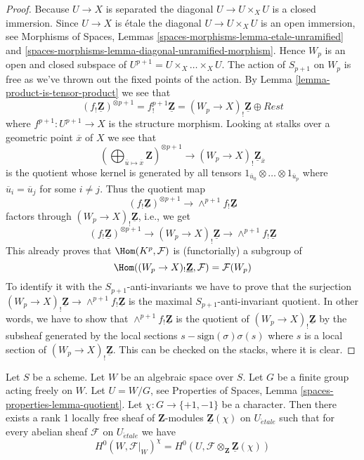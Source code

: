 \begin{proof}
Because $U \to X$ is separated the diagonal $U \to U \times_X U$ is a
closed immersion. Since $U \to X$ is \'etale the diagonal
$U \to U \times_X U$ is an open immersion, see
Morphisms of Spaces, Lemmas
\ref{spaces-morphisms-lemma-etale-unramified} and
\ref{spaces-morphisms-lemma-diagonal-unramified-morphism}.
Hence $W_p$ is an open and closed subspace of
$U^{p + 1} = U \times_X \ldots \times_X U$. The action of $S_{p + 1}$
on $W_p$ is free as we've thrown out the fixed points of the action.
By
Lemma \ref{lemma-product-is-tensor-product}
we see that
$$
(f_!\underline{\mathbf{Z}})^{\otimes p + 1} =
f^{p + 1}_!\underline{\mathbf{Z}} = (W_p \to X)_!\underline{\mathbf{Z}}
\oplus Rest
$$
where $f^{p + 1} : U^{p + 1} \to X$ is the structure morphism.
Looking at stalks over a geometric point $\overline{x}$ of $X$
we see that
$$
\left(
\bigoplus\nolimits_{\overline{u} \mapsto \overline{x}} \mathbf{Z}
\right)^{\otimes p + 1}
\longrightarrow
(W_p \to X)_!\underline{\mathbf{Z}}_{\overline{x}}
$$
is the quotient whose kernel is generated by all tensors
$1_{\overline{u}_0} \otimes \ldots \otimes 1_{\overline{u}_p}$
where $\overline{u}_i = \overline{u}_j$ for some $i \not = j$.
Thus the quotient map
$$
(f_!\underline{\mathbf{Z}})^{\otimes p + 1}
\longrightarrow
\wedge^{p + 1}f_!\underline{\mathbf{Z}}
$$
factors through $(W_p \to X)_!\underline{\mathbf{Z}}$, i.e., we get
$$
(f_!\underline{\mathbf{Z}})^{\otimes p + 1}
\longrightarrow
(W_p \to X)_!\underline{\mathbf{Z}}
\longrightarrow
\wedge^{p + 1}f_!\underline{\mathbf{Z}}
$$
This already proves that $\Hom(K^p, \mathcal{F})$ is (functorially) a
subgroup of
$$
\Hom((W_p \to X)_!\underline{\mathbf{Z}}, \mathcal{F}) = \mathcal{F}(W_p)
$$
To identify it with the $S_{p + 1}$-anti-invariants we have to prove that
the surjection $(W_p \to X)_!\underline{\mathbf{Z}}
\to \wedge^{p + 1}f_!\underline{\mathbf{Z}}$ is the maximal
$S_{p + 1}$-anti-invariant quotient. In other words, we have to show that
$\wedge^{p + 1}f_!\underline{\mathbf{Z}}$ is the quotient of
$(W_p \to X)_!\underline{\mathbf{Z}}$ by the subsheaf generated by
the local sections $s - \text{sign}(\sigma)\sigma(s)$ where $s$ is
a local section of $(W_p \to X)_!\underline{\mathbf{Z}}$.
This can be checked on the stacks, where it is clear.
\end{proof}

\begin{lemma}
\label{lemma-twist}
Let $S$ be a scheme. Let $W$ be an algebraic space over $S$.
Let $G$ be a finite group acting freely on $W$.
Let $U = W/G$, see
Properties of Spaces, Lemma \ref{spaces-properties-lemma-quotient}.
Let $\chi : G \to \{+1, -1\}$ be a character.
Then there exists a rank 1 locally free sheaf of $\mathbf{Z}$-modules
$\underline{\mathbf{Z}}(\chi)$ on $U_{\acute{e}tale}$ such that for every
abelian sheaf $\mathcal{F}$ on $U_{\acute{e}tale}$ we have
$$
H^0(W, \mathcal{F}|_W)^\chi =
H^0(U, \mathcal{F} \otimes_{\mathbf{Z}} \underline{\mathbf{Z}}(\chi))
$$
\end{lemma}

